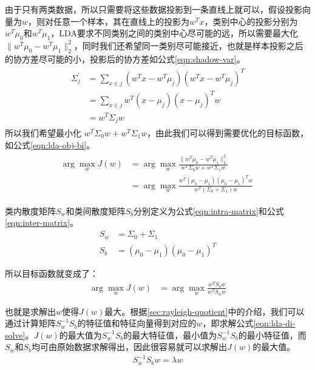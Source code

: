 由于只有两类数据，所以只需要将这些数据投影到一条直线上就可以，假设投影向量为$w$，则对任意一个样本，其在直线上的投影为$w^{T}x$，类别中心的投影分别为$w^{T}\mu_{0}$和$w^{T}\mu_{1}$，LDA要求不同类别之间的类别中心尽可能的远，所以需要最大化$\parallel w^{T}\mu_{0} - w^{T}\mu_{1} \parallel_{2}^{2}$，同时我们还希望同一类别尽可能接近，也就是样本投影之后的协方差尽可能的小，投影后的协方差如公式\ref{eqn:shadow-var}。
\begin{align}
\label{eqn:shadow-var}
\begin{split}
\Sigma_{j}^{'} &= \sum_{x\in{j}} (w^{T}x-w^{T}\mu_{j})(w^{T}x-w^{T}\mu_{j})^{T} \\
               &= \sum_{x\in{j}} w^{T}(x-\mu_{j})(x-\mu_{j})^{T}w \\
               &= w^{T}\Sigma_{j} w
\end{split}
\end{align}
所以我们希望最小化 $w^{T}\Sigma_{0} w + w^{T}\Sigma_{1} w$，由此我们可以得到需要优化的目标函数，如公式\ref{eqn:lda-obj-bi}。
\begin{align}
\label{eqn:lda-obj-bi}
\begin{split}
\arg\mathop{\max}_{w} J(w) &= \arg\mathop{\max}_{w}  \frac{\parallel w^{T}\mu_{0} - w^{T}\mu_{1} \parallel_{2}^{2}}{w^{T}\Sigma_{0} w + w^{T}\Sigma_{1} w} \\
                           &= \arg\mathop{\max}_{w}  \frac{w^{T} (\mu_{0} - \mu_{1}) (\mu_{0} - \mu_{1})^{T}w }{w^{T}(\Sigma_{0} + \Sigma_{1}) w} \
\end{split}
\end{align}

类内散度矩阵$S_w$和类间散度矩阵$S_b$分别定义为公式\ref{eqn:intra-matrix}和公式\ref{eqn:inter-matrix}。
\begin{align}
S_w &= \Sigma_{0} + \Sigma_{1} \label{eqn:intra-matrix}\\
S_b &= (\mu_{0} - \mu_{1}) (\mu_{0} - \mu_{1})^{T}  \label{eqn:inter-matrix}
\end{align}

所以目标函数就变成了：
\begin{align}
\label{eqn:lda-obj-bi-rui}
\arg\mathop{\max}_{w} J(w)  &= \arg\mathop{\max}_{w} \frac{w^{T}S_{b}w}{w^{T}S_{w}w} 
\end{align}

也就是求解出$w$使得$J(w)$最大。根据\ref{sec:rayleigh-quotient}中的介绍，我们可以通过计算矩阵$S_{w}^{-1}S_{b}$的特征值和特征向量得到对应的$w$，即求解公式\ref{eqn:lda-di-solve}。$J(w)$的最大值为$S_{w}^{-1}S_{b}$的最大特征值，最小值为$S_{w}^{-1}S_{b}$的最小特征值，而$S_w$和$S_b$均可由原始数据求解得出，因此很容易就可以求解出$J(w)$的最大值。
\begin{align}
\label{eqn:lda-di-solve}
S_{w}^{-1}S_{b}w = \lambda{w}
\end{align}

